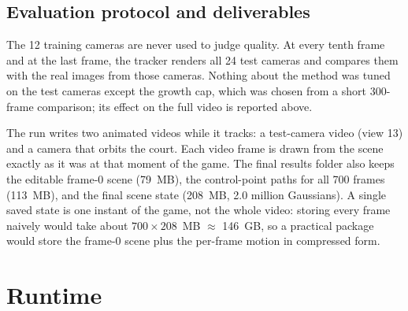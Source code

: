 \documentclass[11pt]{article}
\begin{document}
\subsection{Evaluation protocol and deliverables}
The 12 training cameras are never used to judge quality. At every tenth frame and at the last frame,
the tracker renders all 24 test cameras and compares them with the real images from those cameras.
Nothing about the method was tuned on the test cameras except the growth cap, which was chosen from a
short 300-frame comparison; its effect on the full video is reported above.

The run writes two animated videos while it tracks: a test-camera video (view 13) and a camera that
orbits the court. Each video frame is drawn from the scene exactly as it was at that moment of the
game. The final results folder also keeps the editable frame-0 scene (79~MB), the control-point paths
for all 700 frames (113~MB), and the final scene state (208~MB, 2.0 million Gaussians). A single
saved state is one instant of the game, not the whole video: storing every frame naively would take
about $700\times208$~MB $\approx$ 146~GB, so a practical package would store the frame-0 scene plus the
per-frame motion in compressed form.

\section{Runtime}
\end{document}
